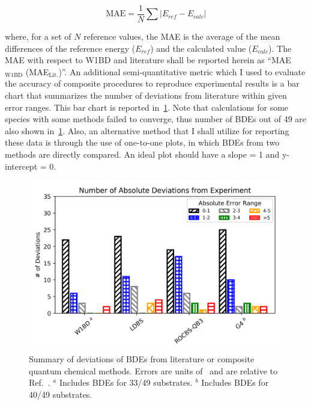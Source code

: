 \begin{equation}
  \mathrm{MAE} = \frac{1}{N} \sum | E_{ref} - E_{calc}|
\end{equation}

\noindent where, for a set of $N$ reference values, the MAE is the average of
the mean differences of the reference energy ($E_{ref}$) and the calculated
value ($E_{calc}$). The MAE with respect to W1BD and literature shall be
reported herein as ``MAE$_{\mathrm{W1BD}}$ (MAE$_{\mathrm{Lit.}}$)''. An
additional semi-quantitative metric which I used to evaluate the accuracy of
composite procedures to reproduce experimental results is a bar chart that
summarizes the number of deviations from literature within given error ranges.
This bar chart is reported in~\ref{fig:maebarchart}. Note that calculations for
some species with some methods failed to converge, thus number of BDEs out of
49 are also shown in~\ref{fig:maebarchart}. Also, an alternative method that I
shall utilize for reporting these data is through the use of one-to-one plots,
in which BDEs from two methods are directly compared. An ideal plot should have
a slope = 1 and y-intercept = 0.

\begin{figure}[!htbp]
  \centering
  \includegraphics[width=\textwidth]{figures/bde-barchart}
  \caption[Summary of deviations of BDEs from literature for composite quantum
  chemical methods.]{Summary of deviations of BDEs from literature or composite
  quantum chemical methods. Errors are units of \kcalmol\ and are relative to
  Ref.~\protect{}. $^a$ Includes BDEs for 33/49 substrates. $^b$
  Includes BDEs for 40/49 substrates.} \label{fig:maebarchart}
\end{figure}

